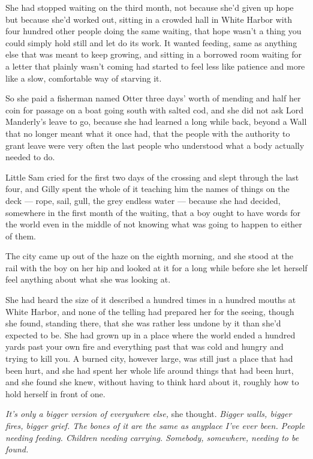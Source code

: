 She had stopped waiting on the third month, not because she’d given up hope but because she’d worked out, sitting in a crowded hall in White Harbor with four hundred other people doing the same waiting, that hope wasn’t a thing you could simply hold still and let do its work. It wanted feeding, same as anything else that was meant to keep growing, and sitting in a borrowed room waiting for a letter that plainly wasn’t coming had started to feel less like patience and more like a slow, comfortable way of starving it.

So she paid a fisherman named Otter three days’ worth of mending and half her coin for passage on a boat going south with salted cod, and she did not ask Lord Manderly’s leave to go, because she had learned a long while back, beyond a Wall that no longer meant what it once had, that the people with the authority to grant leave were very often the last people who understood what a body actually needed to do.

Little Sam cried for the first two days of the crossing and slept through the last four, and Gilly spent the whole of it teaching him the names of things on the deck — rope, sail, gull, the grey endless water — because she had decided, somewhere in the first month of the waiting, that a boy ought to have words for the world even in the middle of not knowing what was going to happen to either of them.

\sceneBreak

The city came up out of the haze on the eighth morning, and she stood at the rail with the boy on her hip and looked at it for a long while before she let herself feel anything about what she was looking at.

She had heard the size of it described a hundred times in a hundred mouths at White Harbor, and none of the telling had prepared her for the seeing, though she found, standing there, that she was rather less undone by it than she’d expected to be. She had grown up in a place where the world ended a hundred yards past your own fire and everything past that was cold and hungry and trying to kill you. A burned city, however large, was still just a place that had been hurt, and she had spent her whole life around things that had been hurt, and she found she knew, without having to think hard about it, roughly how to hold herself in front of one.

\textit{It’s only a bigger version of everywhere else,} she thought. \textit{Bigger walls, bigger fires, bigger grief. The bones of it are the same as anyplace I’ve ever been. People needing feeding. Children needing carrying. Somebody, somewhere, needing to be found.}

